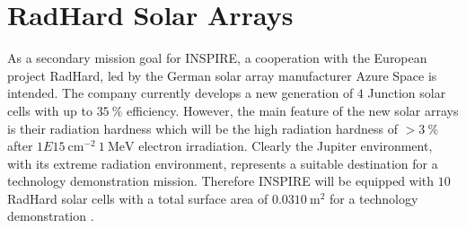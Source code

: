 \section{RadHard Solar Arrays}
\label{subsec:radhard}
As a secondary mission goal for INSPIRE, a cooperation with the European project RadHard, led by the German solar array manufacturer Azure Space is intended. The company currently develops a new generation of $4$ Junction solar cells with up to $35~\% $ efficiency. However, the main feature of the new solar arrays is their radiation hardness which will be the high radiation hardness of $>3~\% $ after $1E15~\text{cm}^{-2} \ 1~\text{MeV}$ electron irradiation. Clearly the Jupiter environment, with its extreme radiation environment, represents a suitable destination for a technology demonstration mission. Therefore INSPIRE will be equipped with $10$ RadHard solar cells with a total surface area of $0.0310~\text{m}^2$ for a technology demonstration \cite{FraunhoferInstituteforSolarEnergySystemsISE.2021}.

